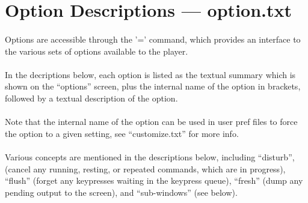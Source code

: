 \section{Option Descriptions --- option.txt}
\paragraph{}Options are accessible through the '=' command, which provides an
interface to the various sets of options available to the player.

\paragraph{}In the decriptions below, each option is listed as the textual summary
which is shown on the ``options'' screen, plus the internal name of the
option in brackets, followed by a textual description of the option.

\paragraph{}Note that the internal name of the option can be used in user pref files
to force the option to a given setting, see ``customize.txt'' for more
info.

\paragraph{}Various concepts are mentioned in the descriptions below, including
``disturb'', (cancel any running, resting, or repeated commands, which are
in progress), ``flush'' (forget any keypresses waiting in the keypress
queue), ``fresh'' (dump any pending output to the screen), and
``sub-windows'' (see below).

